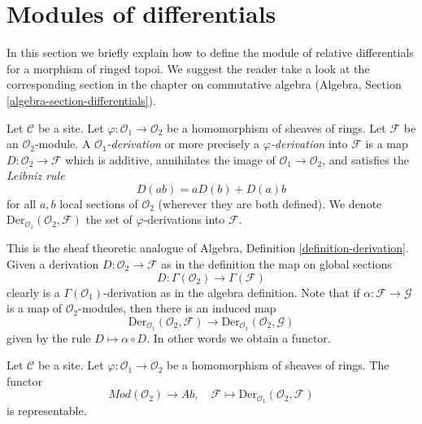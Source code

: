 \section{Modules of differentials}
\label{section-differentials}

\noindent
In this section we briefly explain how to define the module of relative
differentials for a morphism of ringed topoi.
We suggest the reader take a look at the corresponding section
in the chapter on commutative algebra
(Algebra, Section \ref{algebra-section-differentials}).

\begin{definition}
\label{definition-derivation}
Let $\mathcal{C}$ be a site. Let $\varphi : \mathcal{O}_1 \to \mathcal{O}_2$
be a homomorphism of sheaves of rings. Let $\mathcal{F}$
be an $\mathcal{O}_2$-module. A {\it $\mathcal{O}_1$-derivation}
or more precisely a {\it $\varphi$-derivation} into $\mathcal{F}$
is a map $D : \mathcal{O}_2 \to \mathcal{F}$ which is additive, annihilates
the image of $\mathcal{O}_1 \to \mathcal{O}_2$, and satisfies the
{\it Leibniz rule}
$$
D(ab) = aD(b) + D(a)b
$$
for all $a, b$ local sections of $\mathcal{O}_2$
(wherever they are both defined). We denote
$\text{Der}_{\mathcal{O}_1}(\mathcal{O}_2, \mathcal{F})$
the set of $\varphi$-derivations into $\mathcal{F}$.
\end{definition}

\noindent
This is the sheaf theoretic analogue of
Algebra, Definition \ref{definition-derivation}.
Given a derivation $D : \mathcal{O}_2 \to \mathcal{F}$
as in the definition the map on global sections
$$
D : \Gamma(\mathcal{O}_2) \longrightarrow \Gamma(\mathcal{F})
$$
clearly is a $\Gamma(\mathcal{O}_1)$-derivation as in
the algebra definition. Note that if $\alpha : \mathcal{F} \to \mathcal{G}$
is a map of $\mathcal{O}_2$-modules, then there is an induced map
$$
\text{Der}_{\mathcal{O}_1}(\mathcal{O}_2, \mathcal{F})
\longrightarrow
\text{Der}_{\mathcal{O}_1}(\mathcal{O}_2, \mathcal{G})
$$
given by the rule $D \mapsto \alpha \circ D$. In other words
we obtain a functor.

\begin{lemma}
\label{lemma-universal-module}
Let $\mathcal{C}$ be a site. Let $\varphi : \mathcal{O}_1 \to \mathcal{O}_2$
be a homomorphism of sheaves of rings. The functor
$$
\textit{Mod}(\mathcal{O}_2) \longrightarrow \textit{Ab},\quad
\mathcal{F} \longmapsto \text{Der}_{\mathcal{O}_1}(\mathcal{O}_2, \mathcal{F})
$$
is representable.
\end{lemma}

